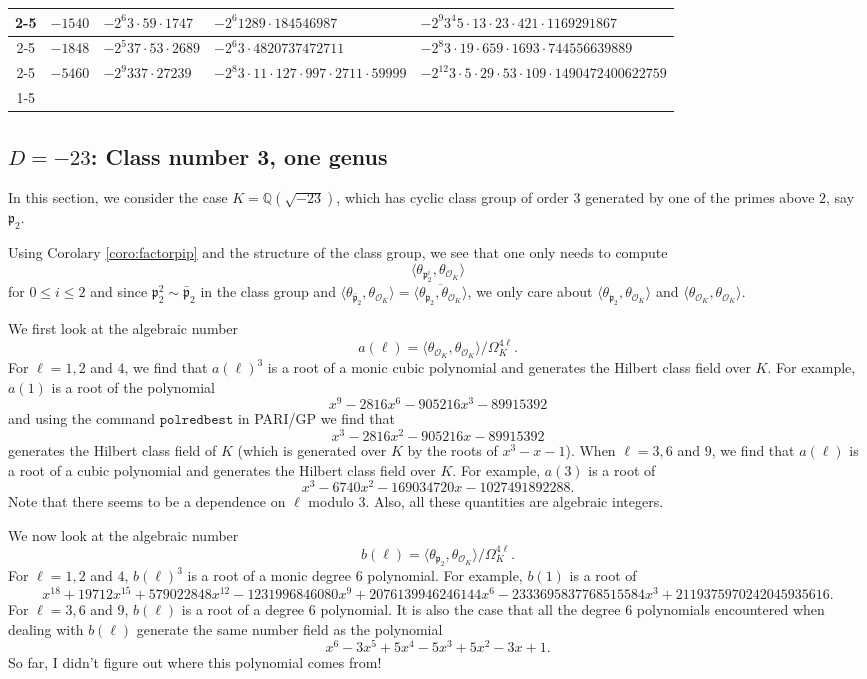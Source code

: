 \documentclass[twoside,10pt]{article}
\newcommand{\Q}{\mathbb{Q}}
\newcommand{\p}{\mathfrak{p}}
\renewcommand{\O}{\mathcal{O}}
\begin{document}
\begin{tabular}{cc|l|p{4.5cm}|p{5.25cm}|}
\cline{2-5}
\multicolumn{1}{ |c| }{}& \multicolumn{1}{|c|}{$-1540$}
& $-2^{6}3\cdot59\cdot1747$ & $-2^{6}1289\cdot184546987$ & $-2^{9}3^{4}5\cdot13\cdot23\cdot421\cdot1169291867$\\
\cline{2-5}
\multicolumn{1}{ |c| }{}& \multicolumn{1}{|c|}{$-1848$}
& $-2^{5}37\cdot53\cdot2689$ & $-2^{6}3\cdot4820737472711$ & $-2^{8}3\cdot19\cdot659\cdot1693\cdot744556639889$\\
\cline{2-5}
\multicolumn{1}{ |c| }{}& \multicolumn{1}{|c|}{$-5460$}
& $-2^{9}337\cdot27239$ & $-2^{8}3\cdot11\cdot127\cdot997\cdot2711\cdot59999$ & $-2^{12}3\cdot5\cdot29\cdot53\cdot109\cdot1490472400622759$\\
\cline{1-5}
\end{tabular}

\subsection{$D=-23$: Class number 3, one genus}
In this section, we consider the case $K=\Q(\sqrt{-23})$, which has cyclic class group of order $3$ generated by one of the primes above $2$, say $\p_2$.

Using Corolary \ref{coro:factorpip} and the structure of the class group, we see that one only needs to compute
\[\langle\theta_{\p_2^i},\theta_{\O_K}\rangle\]
for $0\leq i\leq 2$ and since $\p_2^2\sim\bar{\p}_2$ in the class group and $\langle\theta_{\bar{\p}_2},\theta_{\O_K}\rangle=\overline{\langle\theta_{\p_2},\theta_{\O_K}\rangle}$, we only care about $\langle\theta_{\p_2},\theta_{\O_K}\rangle$ and $\langle\theta_{\O_K},\theta_{\O_K}\rangle$.

We first look at the algebraic number
\[a(\ell)=\langle\theta_{\O_K},\theta_{\O_K}\rangle/\Omega_K^{4\ell}.\]
For $\ell=1,2$ and $4$, we find that $a(\ell)^3$ is a root of a monic cubic polynomial and generates the Hilbert class field over $K$. For example, $a(1)$ is a root of the polynomial
\[x^9 - 2816x^6 - 905216x^3 - 89915392\]
and using the command $\texttt{polredbest}$ in PARI/GP we find that
\[x^3 - 2816x^2 - 905216x - 89915392\]
generates the Hilbert class field of $K$ (which is generated over $K$ by the roots of $x^3-x-1$).
When $\ell=3,6$ and $9$, we find that $a(\ell)$ is a root of a cubic polynomial and generates the Hilbert class field over $K$. For example, $a(3)$ is a root of
\[x^3 - 6740x^2 - 169034720x - 1027491892288.\]
Note that there seems to be a dependence on $\ell$ modulo $3$. Also, all these quantities are algebraic integers.

We now look at the algebraic number
\[b(\ell)=\langle\theta_{\p_2},\theta_{\O_K}\rangle/\Omega_K^{4\ell}.\]
For $\ell=1,2$ and $4$, $b(\ell)^3$ is a root of a monic degree $6$ polynomial. For example, $b(1)$ is a root of
\[x^{18} + 19712x^{15} + 579022848x^{12} - 1231996846080x^9 + 2076139946246144x^6- 2333695837768515584x^3 + 2119375970242045935616.\]
For $\ell=3,6$ and $9$, $b(\ell)$ is a root of a degree $6$ polynomial. It is also the case that all the degree $6$ polynomials encountered when dealing with $b(\ell)$ generate the same number field as the polynomial
\[x^6 - 3x^5 + 5x^4 - 5x^3 + 5x^2 - 3x + 1.\]
So far, I didn't figure out where this polynomial comes from!
\end{document}
